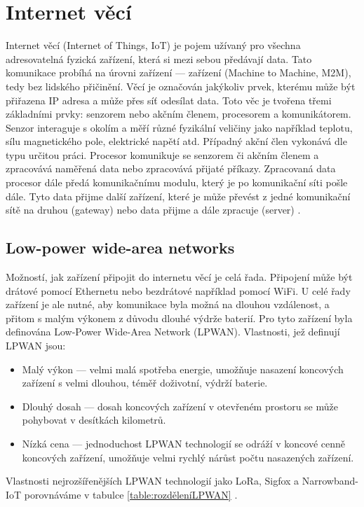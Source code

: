 \chapter{Internet věcí}
\par Internet věcí (Internet of Things, IoT) je pojem užívaný pro všechna adresovatelná fyzická zařízení, která si mezi sebou předávají data. Tato komunikace probíhá na úrovni zařízení — zařízení (Machine to Machine, M2M), tedy bez lidského přičinění. Věcí je označován jakýkoliv prvek, kterému může být přiřazena IP adresa a může přes síť odesílat data. Toto věc je tvořena třemi základními prvky: senzorem nebo akčním členem, procesorem a komunikátorem. Senzor interaguje s okolím a měří různé fyzikální veličiny jako například teplotu, sílu magnetického pole, elektrické napětí atd. Případný akční člen vykonává dle typu určitou práci. Procesor komunikuje se senzorem či akčním členem a zpracovává naměřená data nebo zpracovává přijaté příkazy. Zpracovaná data procesor dále předá komunikačnímu modulu, který je po komunikační síti pošle dále. Tyto data přijme další zařízení, které je může převést z jedné komunikační sítě na druhou (gateway) nebo data přijme a dále zpracuje (server) \cite{Gillisc20052022}. 

\section{Low-power wide-area networks}
\par Možností, jak zařízení připojit do internetu věcí je celá řada. Připojení může být drátové pomocí Ethernetu nebo bezdrátové například pomocí WiFi. U celé řady zařízení je ale nutné, aby komunikace byla možná na dlouhou vzdálenost, a přitom s malým výkonem z důvodu dlouhé výdrže baterií. Pro tyto zařízení byla definována Low-Power Wide-Area Network (LPWAN). Vlastnosti, jež definují LPWAN jsou: 
\begin{itemize}
    \item Malý výkon — velmi malá spotřeba energie, umožňuje nasazení koncových zařízení s velmi dlouhou, téměř doživotní, výdrží baterie.
    \item Dlouhý dosah — dosah koncových zařízení v otevřeném prostoru se může pohybovat v desítkách kilometrů.
    \item Nízká cena — jednoduchost LPWAN technologií se odráží v koncové cenně koncových zařízení, umožňuje velmi rychlý nárůst počtu nasazených zařízení.
\end{itemize}
Vlastnosti nejrozšířenějších LPWAN technologií jako \acs{LoRa}, Sigfox a Narrowband-IoT porovnáváme v tabulce \ref{table:rozděleníLPWAN} \cite{fadsYdeDtJIDXq0T}.

